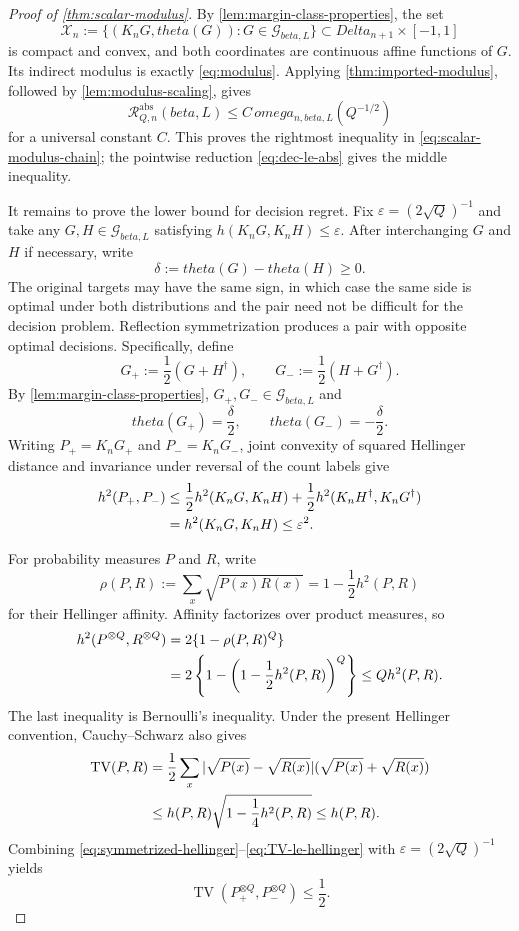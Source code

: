 \documentclass[11pt]{article}
\def\beta{beta}%
\def\theta{theta}%
\def\omega{omega}%
\def\Delta{Delta}%
\newcommand{\TV}{\operatorname{TV}}
\newcommand{\calG}{\mathcal G}
\newcommand{\calR}{\mathcal R}
\newcommand{\eps}{\varepsilon}
\newcommand\aed[1]{{\color{magenta!60!black} #1}}
\begin{document}
\begin{proof}[Proof of \cref{thm:scalar-modulus}]
By \cref{lem:margin-class-properties}, the set
\[
\mathcal X_n
:=
\{(K_nG,\theta(G)):G\in\calG_{\beta,L}\}
\subset\Delta_{n+1}\times[-1,1]
\]
is compact and convex, and both coordinates are continuous affine functions of $G$.  Its indirect modulus is exactly \eqref{eq:modulus}.  Applying \cref{thm:imported-modulus}, followed by \cref{lem:modulus-scaling}, gives
\[
\calR^{\mathrm{abs}}_{Q,n}(\beta,L)
\le
C\,\omega_{n,\beta,L}(Q^{-1/2})
\]
for a universal constant $C$.  This proves the rightmost inequality in \eqref{eq:scalar-modulus-chain}; the pointwise reduction \eqref{eq:dec-le-abs} gives the middle inequality.

It remains to prove the lower bound for decision regret.  Fix \aed{ $\eps=(2\sqrt Q)^{-1}$}
and take any $G,H\in\calG_{\beta,L}$ satisfying $h(K_nG,K_nH)\le\eps$.  After interchanging $G$ and $H$ if necessary, write
\[
\delta:=\theta(G)-\theta(H)\ge0.
\]
The original targets may have the same sign, in which case the same side is optimal under both distributions and the pair need not be difficult for the decision problem.  Reflection symmetrization produces a pair with opposite optimal decisions.  Specifically, define
\[
G_+:=\frac12(G+H^\dagger),
\qquad
G_-:=\frac12(H+G^\dagger).
\]
By \cref{lem:margin-class-properties}, $G_+,G_-\in\calG_{\beta,L}$ and
\[
\theta(G_+)=\frac\delta2,
\qquad
\theta(G_-)=-\frac\delta2.
\]
Writing $P_+=K_nG_+$ and $P_-=K_nG_-$, joint convexity of squared Hellinger distance and invariance under reversal of the count labels give
\begin{align}
h^2(P_+,P_-)
&\le
\frac12h^2(K_nG,K_nH)
+
\frac12h^2(K_nH^\dagger,K_nG^\dagger)
\notag\\
&=
h^2(K_nG,K_nH)
\le\eps^2.
\label{eq:symmetrized-hellinger}
\end{align}

For probability measures $P$ and $R$, write
\[
\rho(P,R):=\sum_x\sqrt{P(x)R(x)}
=1-\frac12h^2(P,R)
\]
for their Hellinger affinity.  Affinity factorizes over product measures, so
\begin{align}
h^2(P^{\otimes Q},R^{\otimes Q})
&=
2\{1-\rho(P,R)^Q\}\notag\\
&=
2\left\{1-\left(1-\frac12h^2(P,R)\right)^Q\right\}
\le
Qh^2(P,R).
\label{eq:product-hellinger}
\end{align}
The last inequality is Bernoulli's inequality.  Under the present Hellinger convention, Cauchy--Schwarz also gives
\begin{align}
\TV(P,R)
&=
\frac12\sum_x
|\sqrt{P(x)}-\sqrt{R(x)}|
(\sqrt{P(x)}+\sqrt{R(x)})\notag\\
&\le
h(P,R)\sqrt{1-\frac14h^2(P,R)}
\le h(P,R).
\label{eq:TV-le-hellinger}
\end{align}
Combining \eqref{eq:symmetrized-hellinger}--\eqref{eq:TV-le-hellinger} with $\eps=(2\sqrt Q)^{-1}$ yields
\begin{equation}
\label{eq:product-TV-small}
\TV(P_+^{\otimes Q},P_-^{\otimes Q})
\le\frac12.
\end{equation}


\end{proof}
\end{document}
